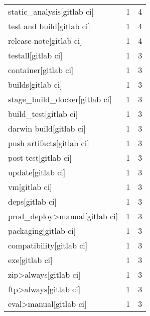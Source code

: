 \begin{tabular}{lrr}
static\_analysis[gitlab ci]                 &                   1 &             4 \\
test and build[gitlab ci]                  &                   1 &             4 \\
release-note[gitlab ci]                    &                   1 &             4 \\
testall[gitlab ci]                         &                   1 &             3 \\
container[gitlab ci]                       &                   1 &             3 \\
builds[gitlab ci]                          &                   1 &             3 \\
stage\_build\_docker[gitlab ci]              &                   1 &             3 \\
build\_test[gitlab ci]                      &                   1 &             3 \\
darwin build[gitlab ci]                    &                   1 &             3 \\
push artifacts[gitlab ci]                  &                   1 &             3 \\
post-test[gitlab ci]                       &                   1 &             3 \\
update[gitlab ci]                          &                   1 &             3 \\
vm[gitlab ci]                              &                   1 &             3 \\
deps[gitlab ci]                            &                   1 &             3 \\
prod\_deploy>manual[gitlab ci]              &                   1 &             3 \\
packaging[gitlab ci]                       &                   1 &             3 \\
compatibility[gitlab ci]                   &                   1 &             3 \\
exe[gitlab ci]                             &                   1 &             3 \\
zip>always[gitlab ci]                      &                   1 &             3 \\
ftp>always[gitlab ci]                      &                   1 &             3 \\
eval>manual[gitlab ci]                     &                   1 &             3 \\

\end{tabular}
